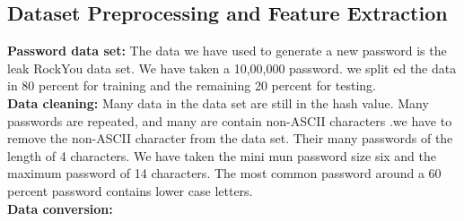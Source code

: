 \documentclass[runningheads]{llncs}
\begin{document}
\subsection{Dataset Preprocessing and Feature Extraction}
\textbf{Password data set:}
The data we have used to generate a new password is the leak RockYou data set. We have taken a 10,00,000 password. we split ed the data in 80 percent for training and the remaining 20 percent for testing.
\newline
\\
\textbf{Data cleaning:}
Many data in the data set are still in the hash value. Many passwords are repeated, and many are contain non-ASCII characters .we have to remove the non-ASCII character from the data set. Their many passwords of the length of 4 characters. We have taken the mini mun password size six and the maximum password of 14 characters. The most common password around a 60 percent password contains lower case letters.
\newline
\\
\textbf{Data conversion:}
\end{document}
